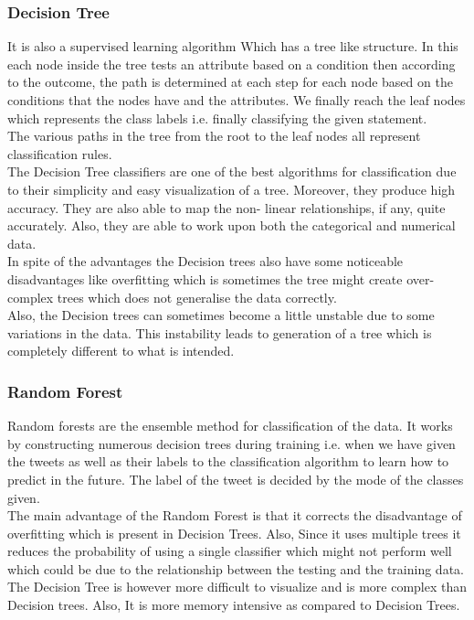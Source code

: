 \documentclass[a4paper,11pt]{article}
\begin{document}
\subsubsection{Decision Tree}
It is also a supervised learning algorithm Which has a tree like structure. In this each node inside the tree tests an attribute based on a condition then according to the outcome, the path is determined at each step for each node based on the conditions that the nodes have and the attributes. We finally reach the leaf nodes which represents the class labels i.e. finally classifying the given statement.\\
The various paths in the tree from the root to the leaf nodes all represent classification rules.
\medskip\\
The Decision Tree classifiers are one of the best algorithms for classification due to their simplicity and easy visualization of a tree. Moreover, they produce high accuracy. They are also able to map the non- linear relationships, if any, quite accurately. Also, they are able to work upon both the categorical and numerical data.
\medskip\\
In spite of the advantages the Decision trees also have some noticeable disadvantages like overfitting which is sometimes the tree might create over-complex trees which does not generalise the data correctly.\\
Also, the Decision trees can sometimes become a little unstable due to some variations in the data. This instability leads to generation of a tree which is completely different to what is intended.
\cite{jadhav2016comparative}
\cite{montillo2009random}
\subsubsection{Random Forest}
Random forests are the ensemble method for classification of the data. It works by constructing numerous decision trees during training i.e. when we have given the tweets as well as their labels to the classification algorithm to learn how to predict in the future. The label of the tweet is decided by the mode of the classes given.
\medskip\\
The main advantage of the Random Forest is that it corrects the disadvantage of overfitting which is present in Decision Trees. Also, Since it uses multiple trees it reduces the probability of using a single classifier which might not perform well which could be due to the relationship between the testing and the training data. 
\medskip\\
The Decision Tree is however more difficult to visualize and is more complex than Decision trees. Also, It is more memory intensive as compared to Decision Trees.
\cite{montillo2009random}
\end{document}
